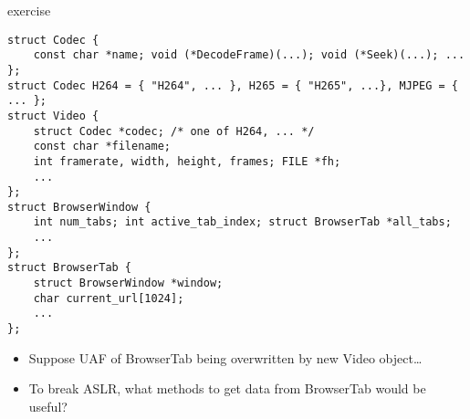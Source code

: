 \begin{frame}[fragile]{exercise}
\begin{Verbatim}[fontsize=\fontsize{9}{10}]
struct Codec {
    const char *name; void (*DecodeFrame)(...); void (*Seek)(...); ...
};
struct Codec H264 = { "H264", ... }, H265 = { "H265", ...}, MJPEG = { ... };
struct Video {
    struct Codec *codec; /* one of H264, ... */
    const char *filename;
    int framerate, width, height, frames; FILE *fh;
    ...
};
struct BrowserWindow {
    int num_tabs; int active_tab_index; struct BrowserTab *all_tabs; 
    ...
};
struct BrowserTab {
    struct BrowserWindow *window;
    char current_url[1024];
    ...
};
\end{Verbatim}
\begin{itemize}
\item \small Suppose UAF of BrowserTab being overwritten by new Video object\ldots
\item \small To break ASLR, what methods to get data from BrowserTab would be useful?
\end{itemize}
\end{frame}
